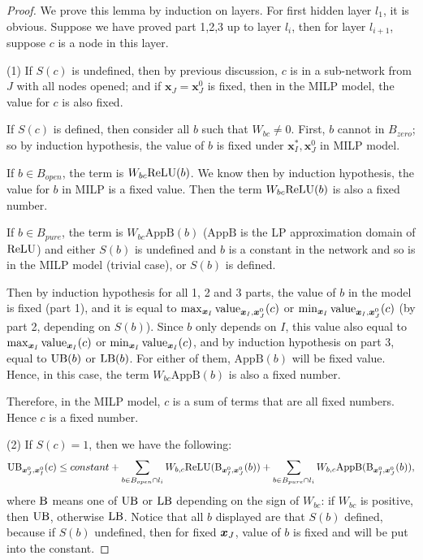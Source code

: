				\begin{proof}
					We prove this lemma by induction on layers. For first hidden layer $l_1$, it is obvious. Suppose we have proved part 1,2,3 up to layer $l_i$, then for layer $l_{i+1}$, suppose $c$ is a node in this layer. 
					
					(1)	If $S(c)$ is undefined, then by previous discussion, $c$ is in a sub-network from $J$ with all nodes opened; and if $\boldsymbol{x}_J=\boldsymbol{x}_J^0$ is fixed, then in the MILP model, the value for $c$ is also fixed. 
					
					If $S(c)$ is defined, then consider all $b$ such that $W_{bc}\neq 0$. First, $b$ cannot in $B_{zero}$; so by induction hypothesis, the value of $b$ is fixed under $\boldsymbol{x}^*_I,\boldsymbol{x}^0_J$ in MILP model. 
					
					
					
					If $b\in B_{open}$, the term is $W_{bc}\mathrm{ReLU}(b)$. We know then by induction hypothesis, the value for $b$ in MILP is a fixed value. Then the term $W_{bc}\mathrm{ReLU}(b)$ is also a fixed number.  
					
					If $b\in B_{pure}$, the term is $W_{bc}\mathrm{AppB}(b)$ ($\mathrm{AppB}$ is the LP approximation domain of $\mathrm{ReLU}$) and either $S(b)$ is undefined and $b$ is a constant in the network and so is in the MILP model (trivial case), or $S(b)$ is defined. 
					
					Then by induction hypothesis for all 1, 2 and 3 parts,  the value of $b$ in the model is fixed (part 1), and it is equal to $\max_{\boldsymbol{x}_I} {\textrm{value}}_{\boldsymbol{x}_I,\boldsymbol{x}^0_J}(c)$ or $\min_{\boldsymbol{x}_I} {\textrm{value}}_{\boldsymbol{x}_I,\boldsymbol{x}^0_J}(c)$ (by part 2, depending on $S(b)$). Since $b$ only depends on $I$, this value also equal to $\max_{\boldsymbol{x}_I} {\textrm{value}}_{\boldsymbol{x}_I}(c)$ or $\min_{\boldsymbol{x}_I} {\textrm{value}}_{\boldsymbol{x}_I}(c)$, and by induction hypothesis on part 3, equal to $\mathrm{UB}(b)$ or $\mathrm{LB}(b)$. For either of them, $\mathrm{AppB}(b)$ will be fixed value. Hence, in this case, the term $W_{bc}\mathrm{AppB}(b)$ is also a fixed number.
					
					Therefore, in the MILP model, $c$ is a sum of terms that are all fixed numbers. Hence $c$ is a fixed number.
					
					(2) If $S(c)=1$, then we have the following:	\begin{align*}
						\mathrm{UB}_{\boldsymbol{x}^0_J,\boldsymbol{x}^0_I}(c) \leq constant + \sum_{b\in B_{open}\cap l_i} W_{b,c}\mathrm{ReLU}(\mathrm{B}_{\boldsymbol{x}^0_I,\boldsymbol{x}^0_J}(b)) + \sum_{b\in B_{pure}\cap l_{i}} W_{b,c} \mathrm{AppB}(\mathrm{B}_{\boldsymbol{x}^0_I,\boldsymbol{x}^0_J}(b)),
					\end{align*}where $\mathrm{B}$ means one of $\mathrm{UB}$ or $\mathrm{LB}$ depending on the sign of $W_{bc}$: if $W_{bc}$ is positive, then $\mathrm{UB}$, otherwise $\mathrm{LB}$. Notice that all $b$ displayed are that $S(b)$ defined, because if $S(b)$ undefined, then for fixed $\boldsymbol{x}_J$, value of $b$ is fixed and will be put into the constant.
					

\end{proof}
